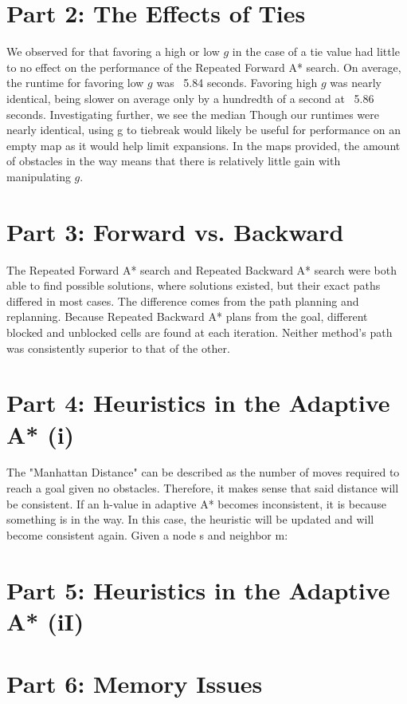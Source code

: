 \documentclass[a4paper,12pt]{article}
\begin{document}
\section{Part 2: The Effects of Ties}
We observed for that favoring a high or low $g$ in the case of a tie value had little to no effect on the performance of the Repeated Forward A* search. On average, the runtime for favoring low $g$ was ~5.84 seconds. Favoring high $g$ was nearly identical, being slower on average only by a hundredth of a second at ~5.86 seconds. Investigating further, we see the median Though our runtimes were nearly identical, using g to tiebreak would likely be useful for performance on an empty map as it would help limit expansions. In the maps provided, the amount of obstacles in the way means that there is relatively little gain with manipulating $g$.
 	
\section{Part 3: Forward vs. Backward}
The Repeated Forward A* search and Repeated Backward A* search were both able to find possible solutions, where solutions existed, but their exact paths differed in most cases. The difference comes from the  path planning and replanning. Because Repeated Backward A* plans from the goal, different blocked and unblocked cells are found at each iteration. Neither method’s path was consistently superior to that of the other. 

\section{Part 4: Heuristics in the Adaptive A* (i)}
The "Manhattan Distance" can be described as the number of moves required to reach a goal given no obstacles. Therefore, it makes sense that said distance will be consistent. If an h-value in adaptive A* becomes inconsistent, it is because something is in the way. In this case, the heuristic will be updated and will become consistent again. \newline
Given a node s and neighbor m: \newline

\section{Part 5:  Heuristics in the Adaptive A* (iI)}

\section{Part 6: Memory Issues}
\end{document}
